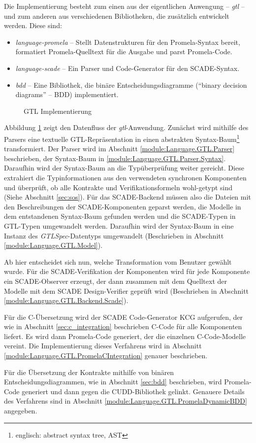

Die Implementierung besteht zum einen aus der eigentlichen Anwengung -- \emph{gtl} -- und zum anderen aus verschiedenen Bibliotheken, die zusätzlich entwickelt werden.
Diese sind:
\begin{itemize}
\item \emph{language-promela} -- Stellt Datenstrukturen für den Promela-Syntax bereit, formatiert Promela-Quelltext für die Ausgabe und parst Promela-Code.
\item \emph{language-scade} -- Ein Parser und Code-Generator für den SCADE-Syntax.
\item \emph{bdd} -- Eine Bibliothek, die binäre Entscheidungsdiagramme ("`binary decision diagrams"' -- BDD) implementiert.
\end{itemize}

\begin{figure}[h]
  \centering
  
  \caption{GTL Implementierung}
  \label{fig:gtl_implementation}
\end{figure}

Abbildung \ref{fig:gtl_implementation} zeigt den Datenfluss der \emph{gtl}-Anwendung.
Zunächst wird mithilfe des Parsers eine textuelle GTL-Repräsentation in einen abstrakten Syntax-Baum\footnote{englisch: abstract syntax tree, AST} transformiert.
Der Parser wird im Abschnitt \ref{module:Language.GTL.Parser} beschrieben, der Syntax-Baum in \ref{module:Language.GTL.Parser.Syntax}.
Daraufhin wird der Syntax-Baum an die Typüberprüfung weiter gereicht.
Diese extrahiert die Typinformationen aus den verwendeten synchronen Komponenten und überprüft, ob alle Kontrakte und Verifikationsformeln wohl-getypt sind (Siehe Abschnitt \ref{sec:sos}).
Für das SCADE-Backend müssen also die Dateien mit den Beschreibungen der SCADE-Komponenten geparst werden, die Modelle in dem entstandenen Syntax-Baum gefunden werden und die SCADE-Typen in GTL-Typen umgewandelt werden.
Daraufhin wird der Syntax-Baum in eine Instanz des \emph{GTLSpec}-Datentyps umgewandelt (Beschrieben in Abschnitt \ref{module:Language.GTL.Model}).

Ab hier entscheidet sich nun, welche Transformation vom Benutzer gewählt wurde.
Für die SCADE-Verifikation der Komponenten wird für jede Komponente ein SCADE-Observer erzeugt, der dann zusammen mit dem Quelltext der Modelle mit dem SCADE Design-Verifier geprüft wird (Beschrieben in Abschnitt \ref{module:Language.GTL.Backend.Scade}).

Für die C-Übersetzung wird der SCADE Code-Generator KCG aufgerufen, der wie in Abschnitt \ref{sec:c_integration} beschrieben C-Code für alle Komponenten liefert.
Es wird dann Promela-Code generiert, der die einzelnen C-Code-Modelle vereint.
Die Implementierung dieses Verfahrens wird in Abschnitt \ref{module:Language.GTL.PromelaCIntegration} genauer beschrieben.

Für die Übersetzung der Kontrakte mithilfe von binären Entscheidungsdiagrammen, wie in Abschnitt \ref{sec:bdd} beschrieben, wird Promela-Code generiert und dann gegen die CUDD-Bibliothek gelinkt.
Genauere Details des Verfahrens sind in Abschnitt \ref{module:Language.GTL.PromelaDynamicBDD} angegeben.